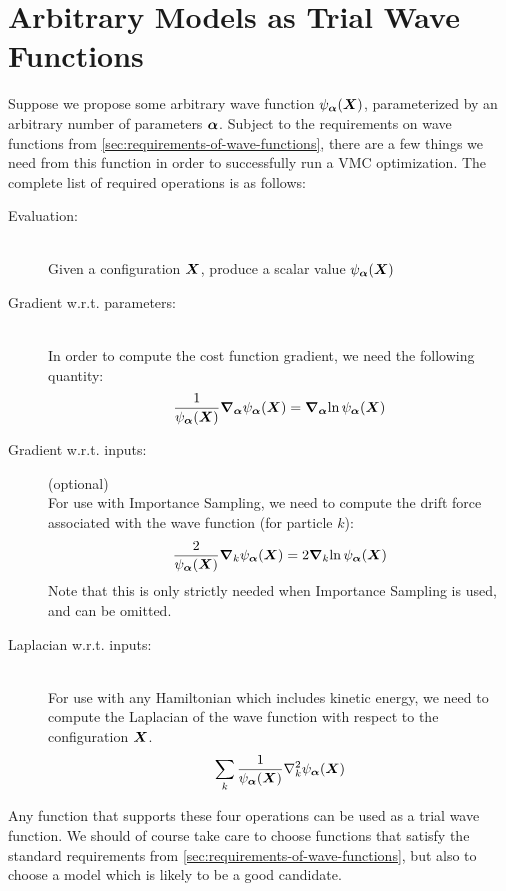 \documentclass[Thesis.tex]{subfiles}
\begin{document}
\section{Arbitrary Models as Trial Wave Functions}

Suppose we propose some arbitrary wave function $\psi_{\bm{\alpha}}(\bm{X})$, parameterized
by an arbitrary number of parameters $\bm{\alpha}$. Subject to the
requirements on wave functions from \cref{sec:requirements-of-wave-functions},
there are a few things we need from this function in order to successfully run a
VMC optimization. The complete list of required operations is as follows:

\begin{description}
\item[Evaluation:]\hfill\\
  Given a configuration $\bm{X}$, produce a scalar value $\psi_{\bm{\alpha}}(\bm{X})$
\item[Gradient w.r.t. parameters:]\hfill\\
  In order to compute the cost function gradient, we need the following
  quantity:
  \begin{align}
    \label{eq:ml-vmc-operation-gradient}
    \frac{1}{\psi_{\bm{\alpha}}(\bm{X})}\grad_{\bm{\alpha}}{\psi_{\bm{\alpha}}(\bm{X})} = \grad_{\bm{\alpha}}{\ln\psi_{\bm{\alpha}}(\bm{X})}
  \end{align}
\item[Gradient w.r.t. inputs:](optional)\hfill\\
  For use with Importance Sampling, we need to compute the drift force
  associated with the wave function (for particle $k$):
  \begin{align}
    \frac{2}{\psi_{\bm{\alpha}}(\bm{X})}\grad_k{\psi_{\bm{\alpha}}(\bm{X})} = 2 \grad_k{\ln\psi_{\bm{\alpha}}(\bm{X})}
  \end{align}
  Note that this is only strictly needed when Importance Sampling is used, and
  can be omitted.
\item[Laplacian w.r.t. inputs:]\hfill\\
  For use with any Hamiltonian which includes kinetic energy, we need to compute
  the Laplacian of the wave function with respect to the configuration $\bm{X}$.
  \begin{align}
    \sum_k\frac{1}{\psialpha(\vX)}\laplacian_k\psialpha(\vX)
  \end{align}
\end{description}

Any function that supports these four operations can be used as a trial wave
function. We should of course take care to choose functions that satisfy the
standard requirements from \cref{sec:requirements-of-wave-functions}, but also
to choose a model which is likely to be a good candidate.
\end{document}
